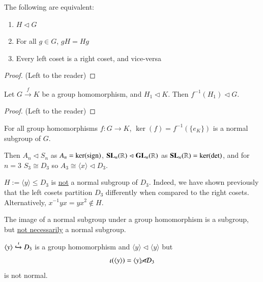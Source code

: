 \documentclass[12pt, a4paper, oneside, openright, titlepage]{book}
\begin{document}
\begin{rmk}
        The following are equivalent:
        \begin{enumerate}
                \item $H \vartriangleleft G$
                \item For all $g \in G$, $gH = Hg$
                \item Every left coset is a right coset, and vice-versa
        \end{enumerate}
\end{rmk}
\begin{proof}
        (Left to the reader)
\end{proof}

\begin{prop}
        Let $G\xrightarrow{f}K$ be a group homomorphism, and $H_1 \vartriangleleft K$. Then $f^{-1}(H_1) \vartriangleleft G$.
\end{prop}
\begin{proof}
        (Left to the reader)
\end{proof}

\begin{cor}
        For all group homomorphisms $f:G\rightarrow K$, $\ker(f) = f^{-1}(\{e_K\})$ is a normal subgroup of $G$.
\end{cor}

\begin{eg}
        Then $A_n\vartriangleleft S_n$ as $A_n = \ker(\operatorname{sign})$, $\mathbf{SL}_n(\mathbb R) \vartriangleleft \mathbf{GL}_n(\mathbb R)$ as $\mathbf{SL}_n(\mathbb R) = \ker(\det)$, and for $n = 3$ $S_3 \cong D_3$ so $A_3 \cong \langle x \rangle \vartriangleleft D_3$.
\end{eg}

\begin{eg}
        $H := \langle y \rangle \leq D_3$ is \underline{not} a normal subgroup of $D_3$. Indeed, we have shown previously that the left cosets partition $D_3$ differently when compared to the right cosets. Alternatively, $x^{-1}yx = yx^2 \notin H$.
\end{eg}

\begin{rmk}
        The image of a normal subgroup under a group homomorphism is a subgroup, but \underline{not necessarily} a normal subgroup.
\end{rmk}

\begin{eg}
        $\langle y \rangle \xhookrightarrow{\iota}D_3$ is a group homomorphism and $\langle y \rangle \vartriangleleft \langle y \rangle$ but $$\iota(\langle y \rangle) = \langle y \rangle \cancel{\vartriangleleft} D_3$$ is not normal.
\end{eg}
\end{document}
